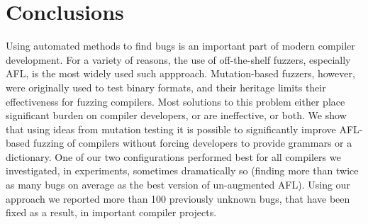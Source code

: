 \section{Conclusions}

Using automated methods to find bugs is an important part of modern
compiler development.  For a variety of reasons, the use of
off-the-shelf fuzzers, especially AFL, is the most widely used such
appproach.  Mutation-based fuzzers, however, were originally used to
test binary formats, and their heritage limits their effectiveness for
fuzzing compilers.  Most solutions to this problem either place significant
burden on compiler developers, or are ineffective, or both.  We show
that using ideas from mutation testing it is possible to significantly
improve AFL-based fuzzing of compilers without forcing developers to
provide grammars or a dictionary.  One of our two configurations
performed best for all compilers we investigated, in experiments,
sometimes dramatically so (finding more than twice as many bugs on
average as the best version of un-augmented AFL).  Using our approach
we reported more than 100 previously unknown bugs, that have been
fixed as a result, in important
compiler projects.